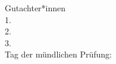 \begin{flushleft}
Gutachter*innen\\
1. \\
2. \\ 
3. \\ 
\vspace{0.1cm}
Tag der mündlichen Prüfung: 
\end{flushleft}


\cleardoublepage


